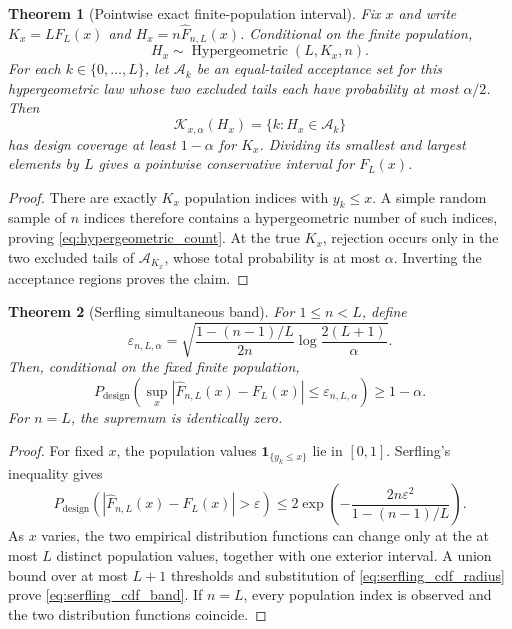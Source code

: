 \documentclass[11pt]{amsart}
\numberwithin{equation}{section}\setcounter{tocdepth}{3}\setcounter{secnumdepth}{3}
\newtheorem{theorem}{Theorem}[section]\newtheorem{proposition}[theorem]{Proposition}
\begin{document}
\begin{theorem}[Pointwise exact finite-population interval]
\label{thm:hypergeometric_finite_population}
Fix $x$ and write $K_x=LF_L(x)$ and
$H_x=n\widehat F_{n,L}(x)$.  Conditional on the finite population,
\begin{equation}
 H_x\sim\operatorname{Hypergeometric}(L,K_x,n).
 \label{eq:hypergeometric_count}
\end{equation}
For each $k\in\{0,\ldots,L\}$, let $\mathcal A_k$ be an equal-tailed acceptance set for
this hypergeometric law whose two excluded tails each have probability at most
$\alpha/2$.  Then
\begin{equation}
 \mathcal K_{x,\alpha}(H_x)
 =\{k:H_x\in\mathcal A_k\}
 \label{eq:hypergeometric_inversion_set}
\end{equation}
has design coverage at least $1-\alpha$ for $K_x$.  Dividing its smallest and largest
elements by $L$ gives a pointwise conservative interval for $F_L(x)$.
\end{theorem}
\begin{proof}
There are exactly $K_x$ population indices with $y_k\le x$.  A simple random sample of
$n$ indices therefore contains a hypergeometric number of such indices, proving
\eqref{eq:hypergeometric_count}.  At the true $K_x$, rejection occurs only in the two
excluded tails of $\mathcal A_{K_x}$, whose total probability is at most $\alpha$.
Inverting the acceptance regions proves the claim.
\end{proof}

\begin{theorem}[Serfling simultaneous band]\label{thm:serfling_cdf_band}
For $1\le n<L$, define
\begin{equation}
 \varepsilon_{n,L,\alpha}
 =\sqrt{\frac{1-(n-1)/L}{2n}
 \log\frac{2(L+1)}{\alpha}}.
 \label{eq:serfling_cdf_radius}
\end{equation}
Then, conditional on the fixed finite population,
\begin{equation}
 P_{\mathrm{design}}\left(
 \sup_x|\widehat F_{n,L}(x)-F_L(x)|
 \le\varepsilon_{n,L,\alpha}\right)\ge1-\alpha.
 \label{eq:serfling_cdf_band}
\end{equation}
For $n=L$, the supremum is identically zero.
\end{theorem}
\begin{proof}
For fixed $x$, the population values
$\mathbf1_{\{y_k\le x\}}$ lie in $[0,1]$.  Serfling's inequality
\cite{Serfling1974} gives
\begin{equation}
 P_{\mathrm{design}}\left(
 |\widehat F_{n,L}(x)-F_L(x)|>\varepsilon\right)
 \le2\exp\left(-\frac{2n\varepsilon^2}{1-(n-1)/L}\right).
 \label{eq:serfling_pointwise_cdf}
\end{equation}
As $x$ varies, the two empirical distribution functions can change only at the at most
$L$ distinct population values, together with one exterior interval.  A union bound over
at most $L+1$ thresholds and substitution of
\eqref{eq:serfling_cdf_radius} prove \eqref{eq:serfling_cdf_band}.  If $n=L$, every
population index is observed and the two distribution functions coincide.
\end{proof}
\end{document}
